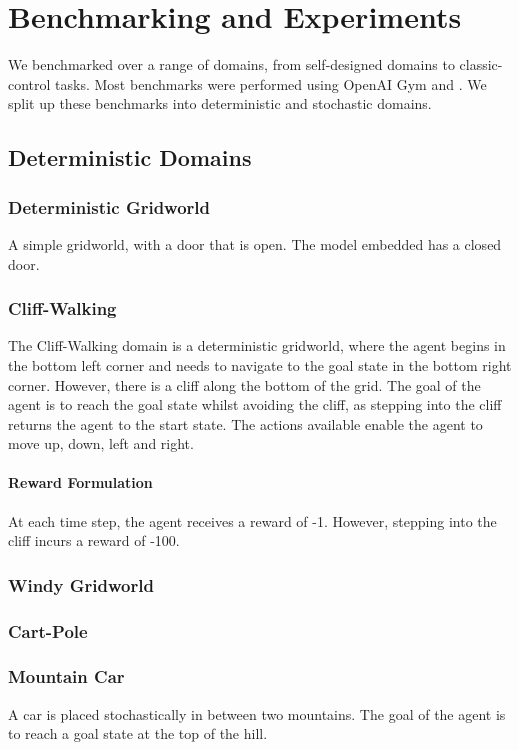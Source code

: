 \chapter{Benchmarking and Experiments}
\label{chapter5}
We benchmarked over a range of domains, from self-designed domains to classic-control tasks. Most benchmarks were performed using OpenAI Gym \cite{1606.01540} and \cite{osband2020bsuite}. We split up these benchmarks into deterministic and stochastic domains.
\section{Deterministic Domains}
\subsection{Deterministic Gridworld}
A simple gridworld, with a door that is open. The model embedded has a closed door.

\subsection{Cliff-Walking}
The Cliff-Walking domain \cite{Sutton1998} is a deterministic gridworld, where the agent begins in the bottom left corner and needs to navigate to the goal state in the bottom right corner. However, there is a cliff along the bottom of the grid. The goal of the agent is to reach the goal state whilst avoiding the cliff, as stepping into the cliff returns the agent to the start state. The actions available enable the agent to move up, down, left and right.
\subsubsection{Reward Formulation}
At each time step, the agent receives a reward of -1. However, stepping into the cliff incurs a reward of -100.

\subsection{Windy Gridworld}
\cite{Sutton1998}

\subsection{Cart-Pole}
\cite{1606.01540, 6313077}

\subsection{Mountain Car}
A car is placed stochastically in between two mountains. The goal of the agent is to reach a goal state at the top of the hill. 

